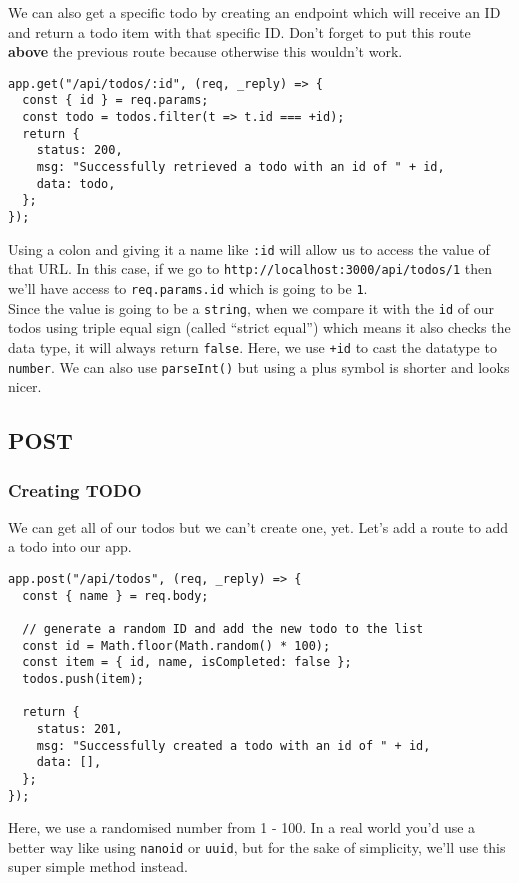 \documentclass[a4paper,14pt,titlepage]{article}
\def\c#1{\texttt{#1}}
\begin{document}
We can also get a specific todo by creating an endpoint which will receive an
ID and return a todo item with that specific ID. Don't forget to put this route
\textbf{above} the previous route because otherwise this wouldn't work.

\begin{verbatim}
app.get("/api/todos/:id", (req, _reply) => {
  const { id } = req.params;
  const todo = todos.filter(t => t.id === +id);
  return {
    status: 200,
    msg: "Successfully retrieved a todo with an id of " + id,
    data: todo,
  };
});
\end{verbatim}

Using a colon and giving it a name like \c{:id} will allow us to access
the value of that URL. In this case, if we go to
\c{http://localhost:3000/api/todos/1} then we'll have access to
\c{req.params.id} which is going to be \texttt{1}.\\

Since the value is going to be a \c{string}, when we compare it with the \c{id}
of our todos using triple equal sign (called ``strict equal'') which means it also
checks the data type, it will always return \c{false}. Here, we use
\c{+id} to cast the datatype to \texttt{number}. We can also use
\c{parseInt()} but using a plus symbol is shorter and looks nicer.

\newpage

\subsection{POST}
\subsubsection{Creating TODO}

We can get all of our todos but we can't create one, yet. Let's add a route to
add a todo into our app.

\begin{verbatim}
app.post("/api/todos", (req, _reply) => {
  const { name } = req.body;

  // generate a random ID and add the new todo to the list
  const id = Math.floor(Math.random() * 100);
  const item = { id, name, isCompleted: false };
  todos.push(item);

  return {
    status: 201,
    msg: "Successfully created a todo with an id of " + id,
    data: [],
  };
});
\end{verbatim}

Here, we use a randomised number from 1 - 100. In a real world you'd use a
better way like using \c{nanoid} or \c{uuid}, but for the sake of simplicity,
we'll use this super simple method instead.\\
\end{document}
